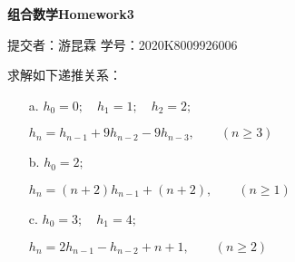 \documentclass[fontset=windows,11pt]{article}
\newtheorem{question}{\hskip 1.7em}
\begin{document}
    \begin{center}
        {\Large \bf 组合数学Homework3}\\
    \end{center}
    \begin{kaishu}
        \hfill 提交者：游昆霖 \quad 学号：2020K8009926006
    \end{kaishu}

\begin{question}
    求解如下递推关系：
    \begin{itemize}
        \item [a.]$h_{0}=0;\quad h_{1}=1;\quad h_{2}=2;$
            \par\hskip12pt$h_{n}=h_{n-1}+9h_{n-2}-9h_{n-3}, \qquad (n\geq 3)$
        \item [b.]$h_{0}=2;$
            \par\hskip12pt$h_{n}=(n+2)h_{n-1}+(n+2), \qquad (n\geq 1)$
        \item [c.]$h_0=3;\quad h_1=4;$
            \par\hskip12pt$h_n=2h_{n-1}-h_{n-2}+n+1, \qquad (n\ge 2)$
    \end{itemize}
\end{question}
\end{document}
